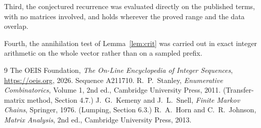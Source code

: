 \documentclass[11pt,a4paper]{article}
\theoremstyle{plain}
\theoremstyle{definition}
\begin{document}
Third, the conjectured recurrence was evaluated directly on the published terms, with no
matrices involved, and holds wherever the proved range and the data overlap.

Fourth, the annihilation test of Lemma~\ref{lem:crit} was carried out in exact integer
arithmetic on the whole vector rather than on a sampled prefix.

\begin{thebibliography}{9}
 The OEIS Foundation, \emph{The On-Line Encyclopedia of Integer
Sequences}, \url{https://oeis.org}, 2026. Sequence A211710.
 R.~P.~Stanley, \emph{Enumerative Combinatorics}, Volume 1, 2nd ed.,
Cambridge University Press, 2011. (Transfer-matrix method, Section 4.7.)
 J.~G.~Kemeny and J.~L.~Snell, \emph{Finite Markov Chains}, Springer, 1976.
(Lumping, Section 6.3.)
 R.~A.~Horn and C.~R.~Johnson, \emph{Matrix Analysis}, 2nd ed., Cambridge
University Press, 2013.
\end{thebibliography}
\end{document}

